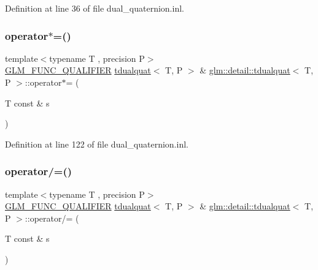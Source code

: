 Definition at line 36 of file dual\+\_\+quaternion.\+inl.

\mbox{\label{structglm_1_1detail_1_1tdualquat_ab958553d52f05997218dc32ff66308ff}} 
\subsubsection{\texorpdfstring{operator$\ast$=()}{operator*=()}}
{\footnotesize\ttfamily template$<$typename T , precision P$>$ \\
\hyperlink{setup_8hpp_a33fdea6f91c5f834105f7415e2a64407}{G\+L\+M\+\_\+\+F\+U\+N\+C\+\_\+\+Q\+U\+A\+L\+I\+F\+I\+ER} \hyperlink{structglm_1_1detail_1_1tdualquat}{tdualquat}$<$ T, P $>$ \& \hyperlink{structglm_1_1detail_1_1tdualquat}{glm\+::detail\+::tdualquat}$<$ T, P $>$\+::operator$\ast$= (\begin{DoxyParamCaption}\item[{T const \&}]{s }\end{DoxyParamCaption})}



Definition at line 122 of file dual\+\_\+quaternion.\+inl.

\mbox{\label{structglm_1_1detail_1_1tdualquat_a16b0b3f78c28d7cf982761d66dada98d}} 
\subsubsection{\texorpdfstring{operator/=()}{operator/=()}}
{\footnotesize\ttfamily template$<$typename T , precision P$>$ \\
\hyperlink{setup_8hpp_a33fdea6f91c5f834105f7415e2a64407}{G\+L\+M\+\_\+\+F\+U\+N\+C\+\_\+\+Q\+U\+A\+L\+I\+F\+I\+ER} \hyperlink{structglm_1_1detail_1_1tdualquat}{tdualquat}$<$ T, P $>$ \& \hyperlink{structglm_1_1detail_1_1tdualquat}{glm\+::detail\+::tdualquat}$<$ T, P $>$\+::operator/= (\begin{DoxyParamCaption}\item[{T const \&}]{s }\end{DoxyParamCaption})}



